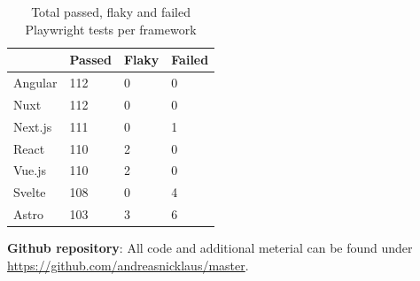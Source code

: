 \documentclass[a4paper, 12pt]{article}
\makeatletter
\renewcommand\listoffigures{%
  \section{\listfigurename}%
  \@mkboth{\MakeUppercase\listfigurename}{\MakeUppercase\listfigurename}%
  \@starttoc{lof}%
}
\renewcommand\listoftables{%
  \section{\listtablename}%
  \@mkboth{\MakeUppercase\listtablename}{\MakeUppercase\listtablename}%
  \@starttoc{lot}%
}
\renewcommand\lstlistoflistings{
  \section{\lstlistlistingname}
  \@starttoc{lol}%
}
\makeatother
\begin{document}
\begin{table}[h]
  \centering
  \begin{tabular}{|l|l|l|l|}
    \hline
    ~         & \textbf{Passed} & \textbf{Flaky}  & \textbf{Failed} \\ \hline
    Angular   & 112             & 0               & 0               \\ \hline
    Nuxt      & 112             & 0               & 0               \\ \hline
    Next.js   & 111             & 0               & 1               \\ \hline
    React     & 110             & 2               & 0               \\ \hline
    Vue.js    & 110             & 2               & 0               \\ \hline
    Svelte    & 108             & 0               & 4               \\ \hline
    Astro     & 103             & 3               & 6               \\ \hline
  \end{tabular}
  \caption{Total passed, flaky and failed Playwright tests per framework}
  \label{tab:playwright:total}
\end{table}

\pagebreak

\appendix



\printnoidxglossary[
  type=\acronymtype,
  nonumberlist,
  nogroupskip,
]

{}

\textbf{Github repository}: All code and additional meterial can be found under \url{https://github.com/andreasnicklaus/master}.

\end{document}
